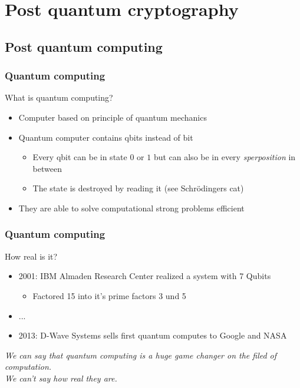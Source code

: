 \section{Post quantum cryptography}
	\subsection{Post quantum computing}	
	
		\begin{frame}
			\frametitle{Quantum computing}
				 What is quantum computing?
				\begin{itemize}
					\item Computer based on principle of quantum mechanics
					\item Quantum computer contains qbits instead of bit
					\begin{itemize}
						\item Every qbit can be in state $0$ or $1$ but can also be in every \textit{sperposition} in between
						\item The state is destroyed by reading it (see Schrödingers cat)
					\end{itemize}
					\item They are able to solve computational strong problems efficient
				\end{itemize}
		\end{frame}
		
		\begin{frame}
			\frametitle{Quantum computing}
				How real is it?
				\begin{itemize}
					\item 2001: IBM Almaden Research Center realized a system with 7 Qubits 
					\begin{itemize}
						\item Factored 15 into it's prime factors 3 und 5
					\end{itemize}
					\item ...
					\item 2013: D-Wave Systems sells first quantum computes to Google and NASA
				\end{itemize}
				\vspace{10pt}
				\begin{block}{}
					\begin{center}
						\textit{
							We can say that quantum computing is a huge game changer on the filed of computation. \\
							We can't say how real they are.}
					\end{center}
				\end{block}
		\end{frame}
		
